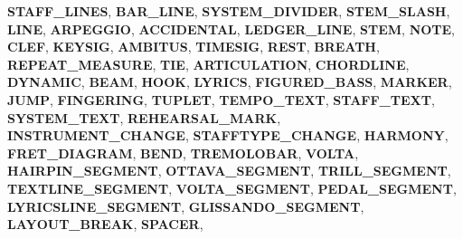 \begin{DoxyCompactItemize}
{\bfseries S\+T\+A\+F\+F\+\_\+\+L\+I\+N\+ES}, 
{\bfseries B\+A\+R\+\_\+\+L\+I\+NE}, 
\newline
{\bfseries S\+Y\+S\+T\+E\+M\+\_\+\+D\+I\+V\+I\+D\+ER}, 
{\bfseries S\+T\+E\+M\+\_\+\+S\+L\+A\+SH}, 
{\bfseries L\+I\+NE}, 
{\bfseries A\+R\+P\+E\+G\+G\+IO}, 
\newline
{\bfseries A\+C\+C\+I\+D\+E\+N\+T\+AL}, 
{\bfseries L\+E\+D\+G\+E\+R\+\_\+\+L\+I\+NE}, 
{\bfseries S\+T\+EM}, 
{\bfseries N\+O\+TE}, 
\newline
{\bfseries C\+L\+EF}, 
{\bfseries K\+E\+Y\+S\+IG}, 
{\bfseries A\+M\+B\+I\+T\+US}, 
{\bfseries T\+I\+M\+E\+S\+IG}, 
\newline
{\bfseries R\+E\+ST}, 
{\bfseries B\+R\+E\+A\+TH}, 
{\bfseries R\+E\+P\+E\+A\+T\+\_\+\+M\+E\+A\+S\+U\+RE}, 
{\bfseries T\+IE}, 
\newline
{\bfseries A\+R\+T\+I\+C\+U\+L\+A\+T\+I\+ON}, 
{\bfseries C\+H\+O\+R\+D\+L\+I\+NE}, 
{\bfseries D\+Y\+N\+A\+M\+IC}, 
{\bfseries B\+E\+AM}, 
\newline
{\bfseries H\+O\+OK}, 
{\bfseries L\+Y\+R\+I\+CS}, 
{\bfseries F\+I\+G\+U\+R\+E\+D\+\_\+\+B\+A\+SS}, 
{\bfseries M\+A\+R\+K\+ER}, 
\newline
{\bfseries J\+U\+MP}, 
{\bfseries F\+I\+N\+G\+E\+R\+I\+NG}, 
{\bfseries T\+U\+P\+L\+ET}, 
{\bfseries T\+E\+M\+P\+O\+\_\+\+T\+E\+XT}, 
\newline
{\bfseries S\+T\+A\+F\+F\+\_\+\+T\+E\+XT}, 
{\bfseries S\+Y\+S\+T\+E\+M\+\_\+\+T\+E\+XT}, 
{\bfseries R\+E\+H\+E\+A\+R\+S\+A\+L\+\_\+\+M\+A\+RK}, 
{\bfseries I\+N\+S\+T\+R\+U\+M\+E\+N\+T\+\_\+\+C\+H\+A\+N\+GE}, 
\newline
{\bfseries S\+T\+A\+F\+F\+T\+Y\+P\+E\+\_\+\+C\+H\+A\+N\+GE}, 
{\bfseries H\+A\+R\+M\+O\+NY}, 
{\bfseries F\+R\+E\+T\+\_\+\+D\+I\+A\+G\+R\+AM}, 
{\bfseries B\+E\+ND}, 
\newline
{\bfseries T\+R\+E\+M\+O\+L\+O\+B\+AR}, 
{\bfseries V\+O\+L\+TA}, 
{\bfseries H\+A\+I\+R\+P\+I\+N\+\_\+\+S\+E\+G\+M\+E\+NT}, 
{\bfseries O\+T\+T\+A\+V\+A\+\_\+\+S\+E\+G\+M\+E\+NT}, 
\newline
{\bfseries T\+R\+I\+L\+L\+\_\+\+S\+E\+G\+M\+E\+NT}, 
{\bfseries T\+E\+X\+T\+L\+I\+N\+E\+\_\+\+S\+E\+G\+M\+E\+NT}, 
{\bfseries V\+O\+L\+T\+A\+\_\+\+S\+E\+G\+M\+E\+NT}, 
{\bfseries P\+E\+D\+A\+L\+\_\+\+S\+E\+G\+M\+E\+NT}, 
\newline
{\bfseries L\+Y\+R\+I\+C\+S\+L\+I\+N\+E\+\_\+\+S\+E\+G\+M\+E\+NT}, 
{\bfseries G\+L\+I\+S\+S\+A\+N\+D\+O\+\_\+\+S\+E\+G\+M\+E\+NT}, 
{\bfseries L\+A\+Y\+O\+U\+T\+\_\+\+B\+R\+E\+AK}, 
{\bfseries S\+P\+A\+C\+ER}, 

\end{DoxyCompactItemize}
